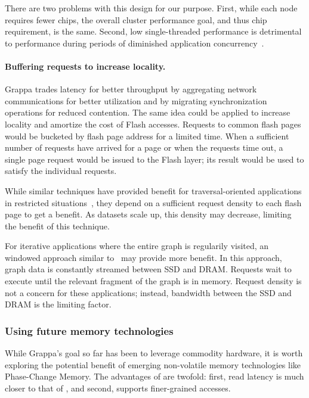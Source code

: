 There are two problems with this design for our purpose. First, while each node
requires fewer chips, the overall cluster performance goal, and thus
chip requirement, is the same. Second, low single-threaded performance is detrimental to performance during periods of diminished application concurrency~\cite{feo:xmt}.

\paragraph{Buffering requests to increase locality.}
Grappa trades latency for better throughput by aggregating network
communications for better utilization and by migrating synchronization
operations for reduced contention. The same idea could be applied to
increase locality and amortize the cost of Flash accesses. Requests
to common flash pages would be bucketed by flash page address for a
limited time. When a sufficient number of requests have arrived for a page
or when the requests time out, a single page request would be issued to the Flash
layer; its result would be used to satisfy the individual requests.

While similar techniques have provided benefit for traversal-oriented applications in
restricted situations~\cite{magt:2010}, they depend on a sufficient request
density to each flash page to get a benefit. As datasets scale up, this
density may decrease, limiting the benefit of this technique.

For iterative applications where the entire graph is regularily
visited, an windowed approach similar to~\cite{graphchi:osdi12} may
provide more benefit. In this approach, graph data is constantly
streamed between SSD and DRAM. Requests wait to execute until the
relevant fragment of the graph is in memory. Request density is not a
concern for these applications; instead, bandwidth between the SSD and
DRAM is the limiting factor.

\subsubsection{Using future memory technologies}

While Grappa's goal so far has been to leverage commodity hardware, it
is worth exploring the potential benefit of emerging non-volatile
memory technologies like Phase-Change Memory. The advantages of 
are twofold: first, read latency is much closer to that of , and
second,  supports finer-grained accesses.

